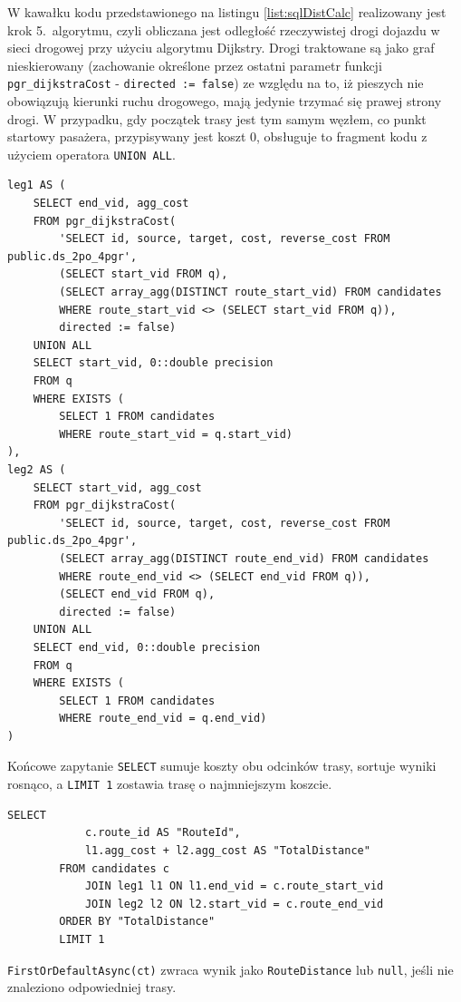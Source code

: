 W kawałku kodu przedstawionego na listingu \ref{list:sqlDistCalc} realizowany jest krok 5.\ algorytmu, czyli obliczana jest odległość rzeczywistej drogi dojazdu w sieci drogowej przy użyciu algorytmu Dijkstry.
Drogi traktowane są jako graf nieskierowany (zachowanie określone przez ostatni parametr funkcji \texttt{pgr\_dijkstraCost} - \texttt{directed := false})
ze względu na to, iż pieszych nie obowiązują kierunki ruchu drogowego, mają jedynie trzymać się prawej strony drogi.
W przypadku, gdy początek trasy jest tym samym węzłem, co punkt startowy pasażera, przypisywany jest koszt 0, obsługuje to fragment kodu z użyciem operatora \texttt{UNION ALL}.
\begin{lstlisting}[label=list:sqlDistCalc,caption=Obliczenie odległości między punktami,style=sqlstyle]
leg1 AS (
    SELECT end_vid, agg_cost
    FROM pgr_dijkstraCost(
        'SELECT id, source, target, cost, reverse_cost FROM public.ds_2po_4pgr',
        (SELECT start_vid FROM q),
        (SELECT array_agg(DISTINCT route_start_vid) FROM candidates
        WHERE route_start_vid <> (SELECT start_vid FROM q)),
        directed := false)
    UNION ALL
    SELECT start_vid, 0::double precision
    FROM q
    WHERE EXISTS (
        SELECT 1 FROM candidates
        WHERE route_start_vid = q.start_vid)
),
leg2 AS (
    SELECT start_vid, agg_cost
    FROM pgr_dijkstraCost(
        'SELECT id, source, target, cost, reverse_cost FROM public.ds_2po_4pgr',
        (SELECT array_agg(DISTINCT route_end_vid) FROM candidates
        WHERE route_end_vid <> (SELECT end_vid FROM q)),
        (SELECT end_vid FROM q),
        directed := false)
    UNION ALL
    SELECT end_vid, 0::double precision
    FROM q
    WHERE EXISTS (
        SELECT 1 FROM candidates
        WHERE route_end_vid = q.end_vid)
)
\end{lstlisting}
Końcowe zapytanie \texttt{SELECT} sumuje koszty obu odcinków trasy, sortuje wyniki rosnąco, a \texttt{LIMIT 1} zostawia trasę o najmniejszym koszcie.
\begin{lstlisting}[label=list:sqlFinish,caption=Zsumowanie kosztów i wybór najlepszej trasy,style=sqlstyle]
        SELECT
            c.route_id AS "RouteId",
            l1.agg_cost + l2.agg_cost AS "TotalDistance"
        FROM candidates c
            JOIN leg1 l1 ON l1.end_vid = c.route_start_vid
            JOIN leg2 l2 ON l2.start_vid = c.route_end_vid
        ORDER BY "TotalDistance"
        LIMIT 1
\end{lstlisting}
\texttt{FirstOrDefaultAsync(ct)} zwraca wynik jako \texttt{RouteDistance} lub \texttt{null}, jeśli nie znaleziono odpowiedniej trasy.
